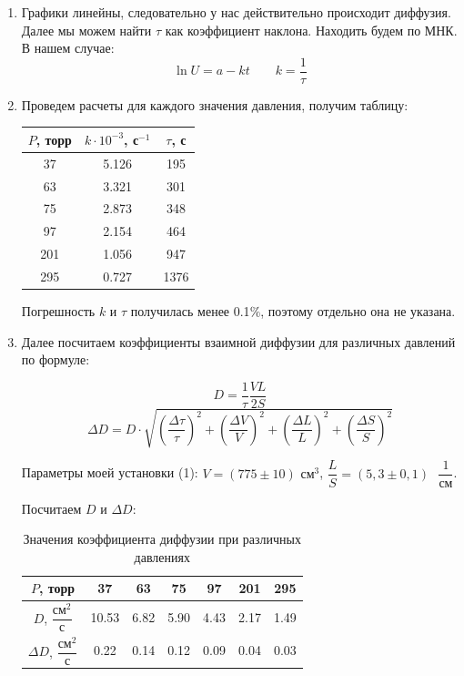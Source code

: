 \documentclass[a4paper,12pt]{article}
\theoremstyle{definition}
\begin{document}
\begin{enumerate}
\begin{figure}[h!]
			\end{figure}
		
			\item Графики линейны, следовательно у нас действительно происходит диффузия. Далее мы можем найти $\tau$ как коэффициент наклона. Находить будем по МНК. В нашем случае: $$\ln{U} =a - k t \qquad k = \frac{1}{\tau}$$
			
			
			\item Проведем расчеты для каждого значения давления, получим таблицу:
			\bgroup
			\def\arraystretch{1.3}%
			\begin{table}[H]
				\centering
				\begin{tabular}{|c|c|c|}
					\hline
					$ P $, торр &  $ k \cdot 10^{-3} $, с$ ^{-1} $ & $ \tau $, с \\ \hline
					37 & 5.126  & 195 \\ \hline
					63 & 3.321  & 301 \\ \hline
					75 & 2.873  & 348 \\ \hline
					97 & 2.154 & 464 \\ \hline
					201 & 1.056  & 947 \\ \hline
	                    295 & 0.727 &  1376\\ \hline
				\end{tabular}
				
			\end{table}
			\egroup
	            Погрешность $k$ и $\tau$ получилась менее 0.1$\%$, поэтому отдельно она не указана.
	            
	
			\item Далее посчитаем коэффициенты взаимной диффузии для различных давлений по формуле:
		
			$$D = \frac{1}{\tau}\frac{VL}{2S}$$
			$$\Delta D = D \cdot \sqrt{\left(\frac{\Delta \tau}{\tau}\right)^2 + \left(\frac{\Delta V}{V}\right)^2 + \left(\frac{\Delta L}{L}\right)^2 + \left(\frac{\Delta S}{S}\right)^2}$$
	
	  
			Параметры моей установки (1): $V = (775\pm 10)\text{ см}^3$, $\dfrac{L}{S} = (5,3\pm 0,1)\text{ }\dfrac{1}{\text{см}}$. 
			
			Посчитаем $D\text{ и }\Delta D$:
			
			\bgroup
			\def\arraystretch{2}%
			\begin{table}[H]
				\centering
				\begin{tabular}{|c||c|c|c|c|c|c|}
					
					\hline
					$ P $, торр & 37&63&75&97&201 & 295\\
					\hline
					$ D $, $\dfrac{\text{см}^2}{\text{с}}$ & 10.53& 6.82& 5.90 & 4.43 & 2.17 & 1.49\\
					\hline
					$ \Delta D $, $\dfrac{\text{см}^2}{\text{с}}$ & 0.22& 0.14 & 0.12& 0.09&0.04 &0.03\\
					\hline
				\end{tabular}
				\caption{Значения коэффициента диффузии при различных давлениях}
				\label{tab:D}
			\end{table}
			\egroup
			

\end{enumerate}
\end{document}
